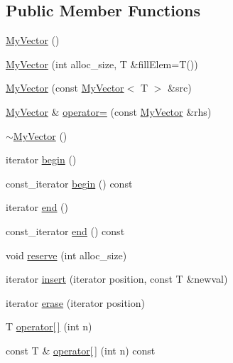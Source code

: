 \subsection*{Public Member Functions}
\begin{DoxyCompactItemize}
\item 
\hyperlink{classnserkkvector_1_1MyVector_a08c4f3b0452a7b948575be6e314fb1e5}{My\-Vector} ()
\item 
\hyperlink{classnserkkvector_1_1MyVector_a28304d57842aa7d53c82f1dc1609571a}{My\-Vector} (int alloc\-\_\-size, T \&fill\-Elem=T())
\item 
\hyperlink{classnserkkvector_1_1MyVector_a3a6a68ac048925dd90787c4ef7394d9d}{My\-Vector} (const \hyperlink{classnserkkvector_1_1MyVector}{My\-Vector}$<$ T $>$ \&src)
\item 
\hyperlink{classnserkkvector_1_1MyVector}{My\-Vector} \& \hyperlink{classnserkkvector_1_1MyVector_a2fb5d92fbe96180a02000e26b74e2322}{operator=} (const \hyperlink{classnserkkvector_1_1MyVector}{My\-Vector} \&rhs)
\item 
\hyperlink{classnserkkvector_1_1MyVector_ad9756f4689fe2b67b7b90ae54352d537}{$\sim$\-My\-Vector} ()
\item 
iterator \hyperlink{classnserkkvector_1_1MyVector_acbc69c4ebe8b558f2501288defc408f3}{begin} ()
\item 
const\-\_\-iterator \hyperlink{classnserkkvector_1_1MyVector_a75db7328d5f9b832ddefc5b150400b31}{begin} () const 
\item 
iterator \hyperlink{classnserkkvector_1_1MyVector_a7d9303b06eef419159d069a04b14aa62}{end} ()
\item 
const\-\_\-iterator \hyperlink{classnserkkvector_1_1MyVector_a02b21caae0eb09bb743da7a0377332a7}{end} () const 
\item 
void \hyperlink{classnserkkvector_1_1MyVector_adcd5abe3736336323650ac82177a735b}{reserve} (int alloc\-\_\-size)
\item 
iterator \hyperlink{classnserkkvector_1_1MyVector_af4dabeb13a9f939dbac185e8612a9c97}{insert} (iterator position, const T \&newval)
\item 
iterator \hyperlink{classnserkkvector_1_1MyVector_a1277bd066bb9d1c4710de998c8c1794a}{erase} (iterator position)
\item 
T \hyperlink{classnserkkvector_1_1MyVector_a701323e9da33aba5e3177e9a5bfe9d8c}{operator\mbox{[}$\,$\mbox{]}} (int n)
\item 
const T \& \hyperlink{classnserkkvector_1_1MyVector_a541e75a1fe77de2ec8e4d3b01e71a8de}{operator\mbox{[}$\,$\mbox{]}} (int n) const 

\end{DoxyCompactItemize}
